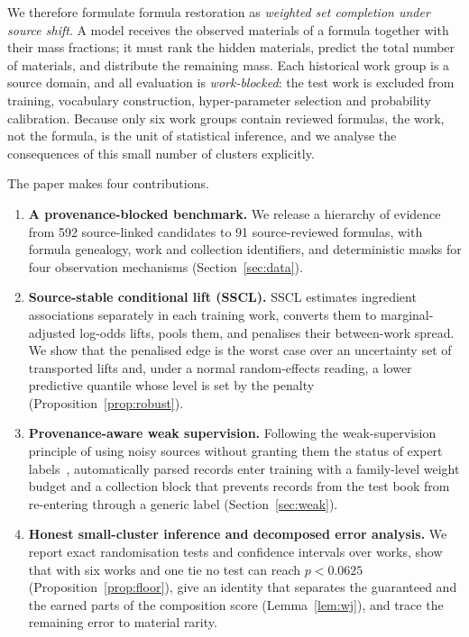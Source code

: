 \documentclass[10pt,a4paper]{article}
\begin{document}
We therefore formulate formula restoration as \emph{weighted set completion under source shift}. A model receives the observed materials of a formula together with their mass fractions; it must rank the hidden materials, predict the total number of materials, and distribute the remaining mass. Each historical work group is a source domain, and all evaluation is \emph{work-blocked}: the test work is excluded from training, vocabulary construction, hyper-parameter selection and probability calibration. Because only six work groups contain reviewed formulas, the work, not the formula, is the unit of statistical inference, and we analyse the consequences of this small number of clusters explicitly.

The paper makes four contributions.
\begin{enumerate}
\item \textbf{A provenance-blocked benchmark.} We release a hierarchy of evidence from 592 source-linked candidates to 91 source-reviewed formulas, with formula genealogy, work and collection identifiers, and deterministic masks for four observation mechanisms (Section~\ref{sec:data}).
\item \textbf{Source-stable conditional lift (SSCL).} SSCL estimates ingredient associations separately in each training work, converts them to marginal-adjusted log-odds lifts, pools them, and penalises their between-work spread. We show that the penalised edge is the worst case over an uncertainty set of transported lifts and, under a normal random-effects reading, a lower predictive quantile whose level is set by the penalty (Proposition~\ref{prop:robust}).
\item \textbf{Provenance-aware weak supervision.} Following the weak-supervision principle of using noisy sources without granting them the status of expert labels~\cite{ratner2017}, automatically parsed records enter training with a family-level weight budget and a collection block that prevents records from the test book from re-entering through a generic label (Section~\ref{sec:weak}).
\item \textbf{Honest small-cluster inference and decomposed error analysis.} We report exact randomisation tests and confidence intervals over works, show that with six works and one tie no test can reach $p<0.0625$ (Proposition~\ref{prop:floor}), give an identity that separates the guaranteed and the earned parts of the composition score (Lemma~\ref{lem:wj}), and trace the remaining error to material rarity.
\end{enumerate}
\end{document}
